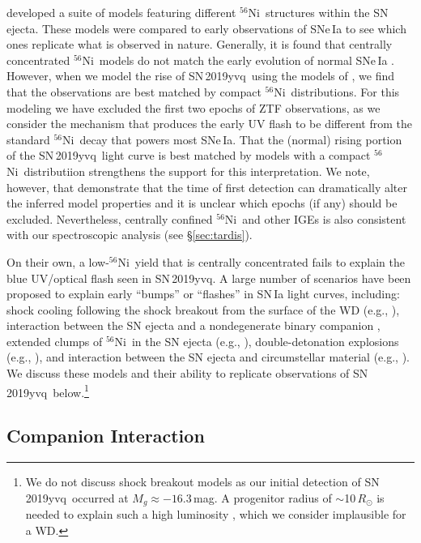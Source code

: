 \documentclass[twocolumn]{aastex63}
\newcommand{\radni}{$^{56}$Ni}
\newcommand{\sn}{SN\,2019yvq}
\begin{document}
\citet{Magee20} developed a suite of models featuring different \radni\
structures within the SN ejecta. These models were compared to early
observations of SNe\,Ia to see which ones replicate what is observed in
nature. Generally, it is found that centrally concentrated \radni\ models do
not match the early evolution of normal SNe\,Ia \citep{Magee20}. However, when
we model the rise of \sn\ using the models of \citet{Magee20}, we find that
the observations are best matched by compact \radni\ distributions. For this
modeling we have excluded the first two epochs of ZTF observations, as we
consider the mechanism that produces the early UV flash to be different from
the standard \radni\ decay that powers most SNe\,Ia. That the (normal) rising
portion of the \sn\ light curve is best matched by models with a compact
\radni\ distributiion strengthens the support for this interpretation. We
note, however, that \citet{Magee20} demonstrate that the time of first
detection can dramatically alter the inferred model properties and it is
unclear which epochs (if any) should be excluded. Nevertheless, centrally
confined \radni\ and other IGEs is also consistent with our spectroscopic
analysis (see \S\ref{sec:tardis}).

On their own, a low-\radni\ yield that is centrally concentrated fails to
explain the blue UV/optical flash seen in \sn. A large number of scenarios
have been proposed to explain early ``bumps'' or ``flashes'' in SN\,Ia light
curves, including: shock cooling following the shock breakout from the surface
of the WD (e.g., \citealt{Piro10,Rabinak11}), interaction between the SN
ejecta and a nondegenerate binary companion \citep{Kasen10a}, extended clumps
of \radni\ in the SN ejecta (e.g., \citealt{Shappee19,Dimitriadis19}),
double-detonation explosions (e.g., \citealt{Noebauer17,Polin19}), and
interaction between the SN ejecta and circumstellar material (e.g.,
\citealt{Dessart14,Piro16,Levanon17}). We discuss these models and their
ability to replicate observations of \sn\ below.\footnote{We do not discuss
shock breakout models as our initial detection of \sn\ occurred at $M_g
\approx -16.3$\,mag. A progenitor radius of $\sim$10$\,R_\odot$ is needed to
explain such a high luminosity \citep{Piro10,Rabinak11}, which we consider
implausible for a WD.}

\subsection{Companion Interaction}\label{sec:companion_interaction}
\end{document}

